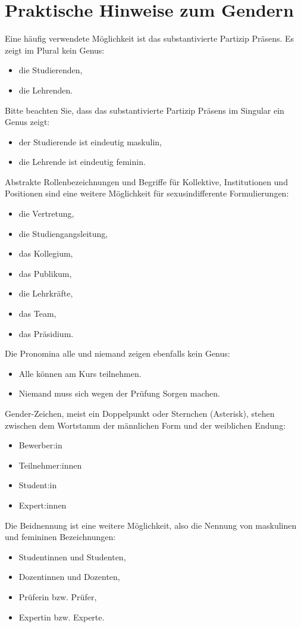\chapter{Praktische Hinweise zum Gendern}
\label{app:gendern}

Eine häufig verwendete Möglichkeit ist das substantivierte Partizip Präsens. Es zeigt im Plural kein Genus:
\begin{itemize}
\item die Studierenden,
\item die Lehrenden.
\end{itemize}

Bitte beachten Sie, dass das substantivierte Partizip Präsens im Singular ein Genus zeigt:
\begin{itemize}
\item der Studierende ist eindeutig maskulin,
\item die Lehrende ist eindeutig feminin.
\end{itemize}

Abstrakte Rollenbezeichnungen und Begriffe für Kollektive, Institutionen und Positionen sind eine weitere Möglichkeit für sexusindifferente Formulierungen:
\begin{itemize}
\item die Vertretung,
\item die Studiengangsleitung,
\item das Kollegium,
\item das Publikum,
\item die Lehrkräfte,
\item das Team,
\item das Präsidium.
\end{itemize}

Die Pronomina alle und niemand zeigen ebenfalls kein Genus:
\begin{itemize}
\item Alle können am Kurs teilnehmen.
\item Niemand muss sich wegen der Prüfung Sorgen machen.
\end{itemize}

Gender-Zeichen, meist ein Doppelpunkt oder Sternchen (Asterisk), stehen zwischen dem Wortstamm der männlichen Form und der weiblichen Endung:
\begin{itemize}
\item Bewerber:in
\item Teilnehmer:innen
\item Student:in
\item Expert:innen
\end{itemize}

Die Beidnennung ist eine weitere Möglichkeit, also die Nennung von maskulinen und femininen Bezeichnungen:
\begin{itemize}
\item Studentinnen und Studenten,
\item Dozentinnen und Dozenten,
\item Prüferin bzw. Prüfer,
\item Expertin bzw. Experte.
\end{itemize}